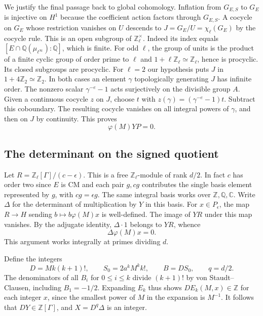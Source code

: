 We justify the final passage back to global cohomology. Inflation
from \(G_{E,S}\) to \(G_E\) is injective on \(H^1\) because the
coefficient action factors through \(G_{E,S}\). A cocycle on \(G_E\)
whose restriction vanishes on \(U\) descends to
\(J=G_E/U=\chi_\ell(G_E)\) by the cocycle rule. This is an open
subgroup of \(\mathbb Z_\ell^\times\). Indeed its index equals
\([E\cap\mathbb Q(\mu_{\ell^\infty}):\mathbb Q]\), which is finite.
For odd \(\ell\), the group of units is the product of a finite
cyclic group of order prime to \(\ell\) and \(1+\ell\mathbb Z_\ell
\simeq\mathbb Z_\ell\), hence is procyclic. Its closed subgroups
are procyclic. For \(\ell=2\) our hypothesis puts \(J\) in
\(1+4\mathbb Z_2\simeq\mathbb Z_2\). In both cases an element
\(\gamma\) topologically generating \(J\) has infinite order.
The nonzero scalar \(\gamma^{-e}-1\) acts surjectively on the
divisible group \(A\). Given a continuous cocycle \(z\) on \(J\),
choose \(t\) with \(z(\gamma)=(\gamma^{-e}-1)t\). Subtract this
coboundary. The resulting cocycle vanishes on all integral powers
of \(\gamma\), and then on \(J\) by continuity. This proves
\[
             \varphi(M)Y P=0 .
\]

\subsection{The determinant on the signed quotient}

Let \(R=\mathbb Z_\ell[\Gamma]/(c-\epsilon)\). This is a free
\(\mathbb Z_\ell\)-module of rank \(d/2\). In fact \(c\) has order
two since \(E\) is CM and each pair \(g,cg\) contributes the
single basis element represented by \(g\), with \(cg=\epsilon g\).
The same integral basis works over \(\mathbb Z,\mathbb Q,\mathbb C\).
Write \(\Delta\) for the determinant of multiplication by \(Y\) in
this basis. For \(x\in P_\epsilon\), the map \(R\to H\) sending
\(b\mapsto b\varphi(M)x\) is well-defined. The image of \(YR\)
under this map vanishes. By the adjugate identity,
\(\Delta\cdot1\) belongs to \(YR\), whence
\begin{equation}
                  \Delta\varphi(M)x=0 .
 \label{eq:cyclotomic-detkill}
\end{equation}
This argument works integrally at primes dividing \(d\).

Define the integers
\[
 D=Mk(k+1)!,\qquad S_0=2a^kM^k k!,\qquad B=D S_0,\qquad q=d/2 .
\]
The denominators of all \(B_i\) for \(0\le i\le k\) divide
\((k+1)!\) by von Staudt--Clausen, including \(B_1=-1/2\).
Expanding \(E_k\) thus shows \(D E_k(M,x)\in\mathbb Z\) for each
integer \(x\), since the smallest power of \(M\) in the expansion
is \(M^{-1}\). It follows that \(DY\in\mathbb Z[\Gamma]\), and
\(X=D^q\Delta\) is an integer.

